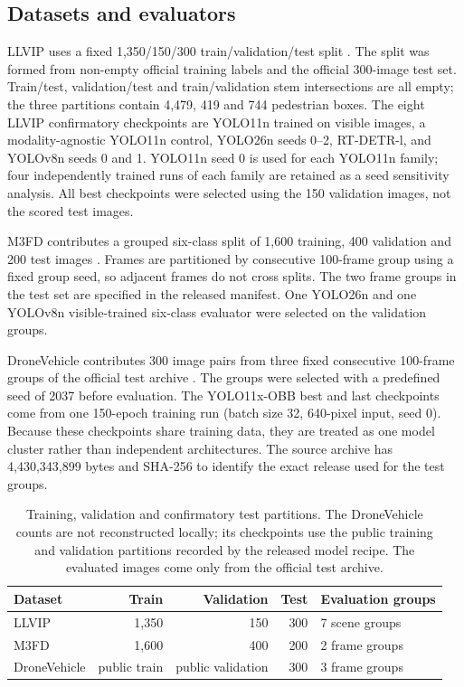 \documentclass[preprint,11pt]{elsarticle}
\begin{document}
\subsection{Datasets and evaluators}

LLVIP uses a fixed 1,350/150/300 train/validation/test split
\cite{jia2021}. The split was formed from non-empty official training labels
and the official 300-image test set. Train/test, validation/test and
train/validation stem intersections are all empty; the three partitions
contain 4,479, 419 and 744 pedestrian boxes. The eight LLVIP confirmatory
checkpoints are YOLO11n trained on visible images, a modality-agnostic YOLO11n
control, YOLO26n seeds 0--2, RT-DETR-l, and YOLOv8n seeds 0 and 1. YOLO11n
seed 0 is used for each YOLO11n family; four independently trained runs of each
family are retained as a seed sensitivity analysis. All best checkpoints were
selected using the 150 validation images, not the scored test images.

M3FD contributes a grouped six-class split of 1,600 training, 400 validation
and 200 test images \cite{liu2022}. Frames are partitioned by consecutive
100-frame group using a fixed group seed, so adjacent frames do not cross
splits. The two frame groups in the test set are specified in the released
manifest. One YOLO26n and one YOLOv8n visible-trained six-class evaluator were
selected on the validation groups.

DroneVehicle contributes 300 image pairs from three fixed consecutive
100-frame groups of the official test archive \cite{sun2022}. The groups were
selected with a predefined seed of 2037 before evaluation. The YOLO11x-OBB
best and last checkpoints come from one 150-epoch training run (batch size 32,
640-pixel input, seed 0). Because these checkpoints share training data, they
are treated as one model cluster rather than independent architectures. The
source archive has 4,430,343,899 bytes and SHA-256
\texttt{}
to identify the exact release used for the test groups.

\begin{table}[t]
\centering
\small
\caption{Training, validation and confirmatory test partitions. The
DroneVehicle counts are not reconstructed locally; its checkpoints use the
public training and validation partitions recorded by the released model
recipe. The evaluated images come only from the official test archive.}
\label{tab:data}
\begin{tabular}{@{}lrrrl@{}}
\toprule
Dataset & Train & Validation & Test & Evaluation groups \\
\midrule
LLVIP & 1,350 & 150 & 300 & 7 scene groups \\
M3FD & 1,600 & 400 & 200 & 2 frame groups \\
DroneVehicle & public train & public validation & 300 & 3 frame groups \\
\bottomrule
\end{tabular}
\end{table}
\end{document}
